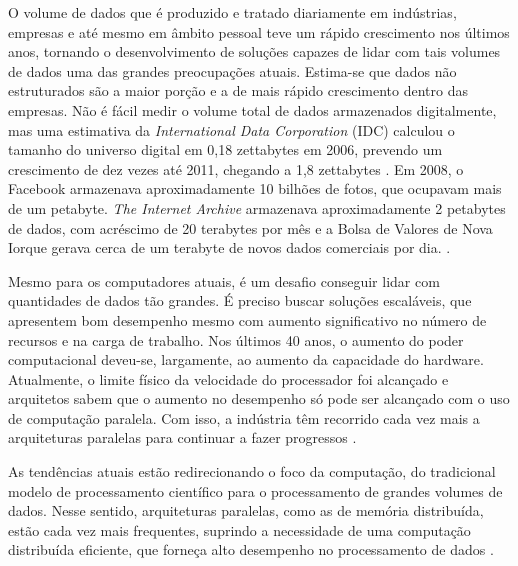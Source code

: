 
O volume de dados que é produzido e tratado diariamente em indústrias, empresas e até mesmo em âmbito pessoal teve um rápido crescimento nos últimos anos, tornando o desenvolvimento de soluções capazes de lidar com tais volumes de dados uma das grandes preocupações atuais. Estima-se que dados não estruturados são a maior porção e a de mais rápido crescimento dentro das empresas. 
Não é fácil medir o volume total de dados armazenados digitalmente, mas uma estimativa da \textit{International Data Corporation} (IDC) calculou o tamanho do universo digital em 0,18 zettabytes em 2006, prevendo um crescimento de dez vezes até 2011, chegando a 1,8 zettabytes \cite{Gantz:2008}.
Em 2008, o Facebook armazenava aproximadamente 10 bilhões de fotos, que ocupavam mais de um petabyte. \textit{The Internet Archive} armazenava aproximadamente 2 petabytes de dados, com acréscimo de 20 terabytes por mês e a Bolsa de Valores de Nova Iorque gerava cerca de um terabyte de novos dados comerciais por dia. 
\cite{White:2009}. %


Mesmo para os computadores atuais, é um desafio conseguir lidar com quantidades de dados tão grandes. É preciso buscar soluções escaláveis, que apresentem bom desempenho mesmo com aumento significativo no número de recursos e na carga de trabalho. 
Nos últimos 40 anos, o aumento do poder computacional deveu-se, largamente, ao aumento da capacidade do hardware. Atualmente, o limite físico da velocidade do processador foi alcançado e arquitetos sabem que o aumento no desempenho só pode ser alcançado com o uso de computação paralela. Com isso, a indústria têm recorrido cada vez mais a arquiteturas paralelas para continuar a fazer progressos \cite{Manferdelli:2008}. 

As tendências atuais estão redirecionando o foco da computação, do tradicional modelo de processamento científico para o processamento de grandes volumes de dados.
Nesse sentido, arquiteturas paralelas, como as de memória distribuída, estão cada vez mais frequentes, suprindo a necessidade de uma computação distribuída eficiente, que forneça alto desempenho no processamento de dados \cite{Bryant:2011}.


